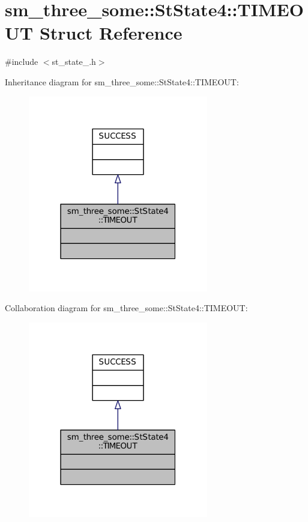 \hypertarget{structsm__three__some_1_1StState4_1_1TIMEOUT}{}\section{sm\+\_\+three\+\_\+some\+:\+:St\+State4\+:\+:T\+I\+M\+E\+O\+UT Struct Reference}
\label{structsm__three__some_1_1StState4_1_1TIMEOUT}


{\ttfamily \#include $<$st\+\_\+state\+\_.\+h$>$}



Inheritance diagram for sm\+\_\+three\+\_\+some\+:\+:St\+State4\+:\+:T\+I\+M\+E\+O\+UT\+:
\nopagebreak
\begin{figure}[H]
\begin{center}
\leavevmode
\includegraphics[width=223pt]{structsm__three__some_1_1StState4_1_1TIMEOUT__inherit__graph}
\end{center}
\end{figure}


Collaboration diagram for sm\+\_\+three\+\_\+some\+:\+:St\+State4\+:\+:T\+I\+M\+E\+O\+UT\+:
\nopagebreak
\begin{figure}[H]
\begin{center}
\leavevmode
\includegraphics[width=223pt]{structsm__three__some_1_1StState4_1_1TIMEOUT__coll__graph}
\end{center}
\end{figure}



